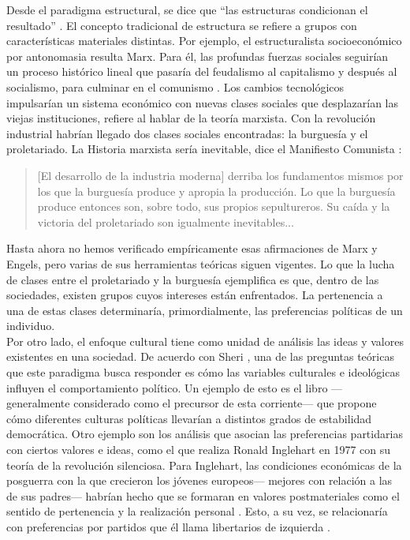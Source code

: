 Desde el paradigma estructural, se dice que ``las estructuras condicionan el resultado'' \parencite{BV08}. El concepto tradicional de estructura se refiere a grupos con características materiales distintas. Por ejemplo, el estructuralista socioeconómico por antonomasia resulta Marx. Para él, las profundas fuerzas sociales seguirían un proceso histórico lineal que pasaría del feudalismo al capitalismo y después al socialismo, para culminar en el comunismo \parencite{BV08}. Los cambios tecnológicos impulsarían un sistema económico con nuevas clases sociales que desplazarían las viejas instituciones, refiere \textcite{Heilbroner92} al hablar de la teoría marxista. Con la revolución industrial habrían llegado dos clases sociales encontradas: la burguesía y el proletariado. La Historia marxista sería inevitable, dice el Manifiesto Comunista \parencite{Heilbroner92}: 

\begin{quote}
[El desarrollo de la industria moderna] derriba los fundamentos mismos por los que la burguesía produce y apropia la producción. Lo que la burguesía produce entonces son, sobre todo, sus propios sepultureros. Su caída y la victoria del proletariado son igualmente inevitables...
\end{quote}

Hasta ahora no hemos verificado empíricamente esas afirmaciones de Marx y Engels, pero varias de sus herramientas teóricas siguen vigentes. Lo que la lucha de clases entre el proletariado y la burguesía ejemplifica es que, dentro de las sociedades, existen grupos cuyos intereses están enfrentados. La pertenencia a una de estas clases determinaría, primordialmente, las preferencias políticas de un individuo.\\

Por otro lado, el enfoque cultural tiene como unidad de análisis las ideas y valores existentes en una sociedad. 
De acuerdo con Sheri \textcite{Berman01}, una de las preguntas teóricas que este paradigma busca responder es cómo las variables culturales e ideológicas influyen el comportamiento político. Un ejemplo de esto es el libro  \parencite{AlmondVerba63}--- generalmente considerado como el precursor de esta corriente--- que propone cómo diferentes culturas políticas llevarían a distintos grados de estabilidad democrática. Otro ejemplo son los análisis que asocian las preferencias partidarias con ciertos valores e ideas, como el que realiza Ronald Inglehart en 1977 con su teoría de la revolución silenciosa. Para Inglehart, las condiciones económicas de la posguerra con la que crecieron los jóvenes europeos--- mejores con relación a las de sus padres--- habrían hecho que se formaran en valores postmateriales como el sentido de pertenencia y la realización personal \parencite{Kesselman79}. Esto, a su vez, se relacionaría con preferencias por partidos que él llama libertarios de izquierda \parencite{Inglehart16}.\\ 

